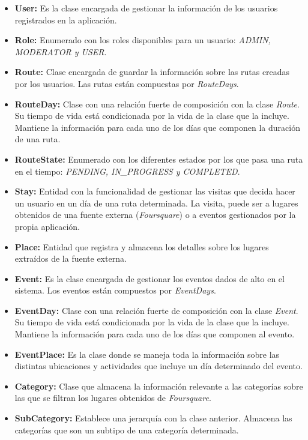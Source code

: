 \begin{itemize}
	\item \textbf{User: } Es la clase encargada de gestionar la información de los usuarios registrados en la aplicación.
	\item \textbf{Role: } Enumerado con los roles disponibles para un usuario: \textit{ADMIN, MODERATOR y USER}.
	\item \textbf{Route: } Clase encargada de guardar la información sobre las rutas creadas por los usuarios. Las rutas están compuestas por \textit{RouteDays}.
	\item \textbf{RouteDay: } Clase con una relación fuerte de composición con la clase \textit{Route}. Su tiempo de vida está condicionada por la vida de la clase que la incluye. Mantiene la información para cada uno de los días que componen la duración de una ruta.
	\item \textbf{RouteState: } Enumerado con los diferentes estados por los que pasa una ruta en el tiempo: \textit{PENDING, IN\_PROGRESS y COMPLETED}.
	\item \textbf{Stay: } Entidad con la funcionalidad de gestionar las visitas que decida hacer un usuario en un día de una ruta determinada. La visita, puede ser a lugares obtenidos de una fuente externa (\textit{Foursquare}) o a eventos gestionados por la propia aplicación.
	\item \textbf{Place: } Entidad que registra y almacena los detalles sobre los lugares extraídos de la fuente externa.
	\item \textbf{Event: } Es la clase encargada de gestionar los eventos dados de alto en el sistema. Los eventos están compuestos por \textit{EventDays}.
	\item \textbf{EventDay: } Clase con una relación fuerte de composición con la clase \textit{Event}. Su tiempo de vida está condicionada por la vida de la clase que la incluye. Mantiene la información para cada uno de los días que componen al evento.
	\item \textbf{EventPlace: } Es la clase donde se maneja toda la información sobre las distintas ubicaciones y actividades que incluye un día determinado del evento.
	\item \textbf{Category: } Clase que almacena la información relevante a las categorías sobre las que se filtran los lugares obtenidos de \textit{Foursquare}.
	\item \textbf{SubCategory: } Establece una jerarquía con la clase anterior. Almacena las categorías que son un subtipo de una categoría determinada.
\end{itemize}


